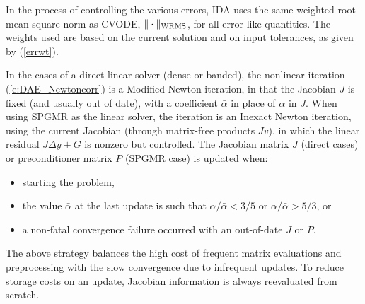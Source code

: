 In the process of controlling the various errors, IDA uses the
same weighted root-mean-square norm as CVODE,
$\|\cdot\|_{\mbox{\scriptsize WRMS}}$, for all error-like quantities.
The weights used are based on the current solution and on input
tolerances, as given by (\ref{errwt}).

In the cases of a direct linear solver (dense or banded), the nonlinear 
iteration (\ref{e:DAE_Newtoncorr}) is a Modified Newton iteration, in
that the Jacobian $J$ is fixed (and usually out of date), with
a coefficient $\bar\alpha$ in place of $\alpha$ in $J$. When using
SPGMR as the linear solver, the iteration is an Inexact Newton iteration,
using the current Jacobian (through matrix-free products $Jv$), in 
which the linear residual $J\Delta y + G$ is nonzero but controlled.
The Jacobian matrix $J$ (direct cases) or preconditioner matrix $P$ 
(SPGMR case) is updated when:
\begin{itemize}
\item starting the problem,
\item the value $\bar\alpha$ at the last update is such that
  $\alpha / {\bar\alpha} < 3/5$ or $\alpha / {\bar\alpha} > 5/3$, or
\item a non-fatal convergence failure occurred with an out-of-date $J$ or $P$.
\end{itemize}
The above strategy balances the high cost of frequent matrix evaluations
and preprocessing with the slow convergence due to infrequent updates.
To reduce storage costs on an update, Jacobian information is always
reevaluated from scratch.

